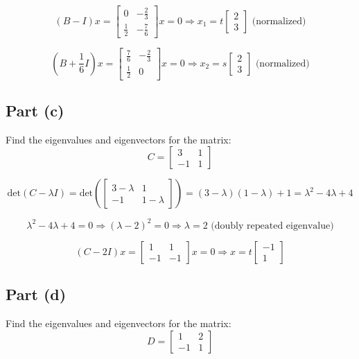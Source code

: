 \documentclass[12pt]{article}
\begin{document}
\[
(B - I)x = \begin{bmatrix} 0 & -\frac{2}{3} \\ \frac{1}{2} & -\frac{7}{6} \end{bmatrix}x = 0 \Rightarrow x_1 = t\begin{bmatrix} 2 \\ 3 \end{bmatrix} \text{ (normalized)}
\]

\[
(B + \frac{1}{6}I)x = \begin{bmatrix} \frac{7}{6} & -\frac{2}{3} \\ \frac{1}{2} & 0 \end{bmatrix}x = 0 \Rightarrow x_2 = s\begin{bmatrix} 2 \\ 3 \end{bmatrix} \text{ (normalized)}
\]

\pagebreak

\subsection*{Part (c)}
Find the eigenvalues and eigenvectors for the matrix:
\[
  C = \begin{bmatrix} 3 & 1 \\ -1 & 1 \end{bmatrix}
\]

\[
  \text{det}(C - \lambda I) = \text{det}\left(\begin{bmatrix} 3-\lambda & 1 \\ -1 & 1-\lambda \end{bmatrix}\right) = (3-\lambda)(1-\lambda) + 1 = \lambda^2 - 4\lambda + 4
\]

\[
  \lambda^2 - 4\lambda + 4 = 0 \Rightarrow (\lambda - 2)^2 = 0 \Rightarrow \lambda = 2 \text{ (doubly repeated eigenvalue)}
\]

\[
  (C - 2I)x = \begin{bmatrix} 1 & 1 \\ -1 & -1 \end{bmatrix}x = 0 \Rightarrow x = t\begin{bmatrix} -1 \\ 1 \end{bmatrix}
\]

\pagebreak

\subsection*{Part (d)}
Find the eigenvalues and eigenvectors for the matrix:
\[
D = \begin{bmatrix} 1 & 2 \\ -1 & 1 \end{bmatrix}
\]
\end{document}
